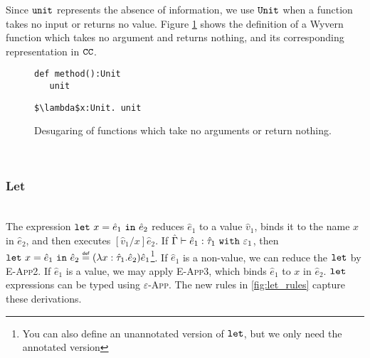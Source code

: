 Since $\mathtt{unit}$ represents the absence of information, we use $\mathtt{Unit}$ when a function takes no input or returns no value. Figure \ref{fig:unit_sugaring} shows the definition of a Wyvern function which takes no argument and returns nothing, and its corresponding representation in $\mathtt{CC}$.

\begin{figure}[h]

\begin{lstlisting}
def method():Unit
   unit
\end{lstlisting}

\begin{lstlisting}
$\lambda$x:Unit. unit
\end{lstlisting}

\caption{Desugaring of functions which take no arguments or return nothing.}
\label{fig:unit_sugaring}
\end{figure}

~

\subsubsection{Let}~\\

\noindent
The expression $\mathtt{let}~ x = \hat e_1~\mathtt{in}~ \hat e_2$ reduces $\hat e_1$ to a value $\hat v_1$, binds it to the name $x$ in $\hat e_2$, and then executes $[\hat v_1/x]\hat e_2$. If $\hat \Gamma \vdash \hat e_1: \hat \tau_1~\mathtt{with}~ \varepsilon_1$, then $\letxpr{x}{\hat e_1}{\hat e_2} \defn (\lambda x: \hat \tau_1 . \hat e_2) \hat e_1$\footnote{You can also define an unannotated version of $\mathtt{let}$, but we only need the annotated version}. If $\hat e_1$ is a non-value, we can reduce the $\mathtt{let}$ by \textsc{E-App2}. If $\hat e_1$ is a value, we may apply \textsc{E-App3}, which binds $\hat e_1$ to $x$ in $\hat e_2$. $\mathtt{let}$ expressions can be typed using \textsc{$\varepsilon$-App}. The new rules in \ref{fig:let_rules} capture these derivations.

